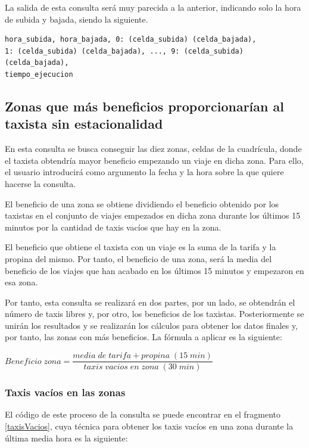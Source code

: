 La salida de esta consulta será muy parecida a la anterior, indicando solo la hora de subida y bajada, siendo la siguiente.

\begin{verbatim}
hora_subida, hora_bajada, 0: (celda_subida) (celda_bajada),
1: (celda_subida) (celda_bajada), ..., 9: (celda_subida) (celda_bajada),
tiempo_ejecucion
\end{verbatim}

\subsection{Zonas que más beneficios proporcionarían al taxista sin estacionalidad \label{profSinExplicacion}}
En esta consulta se busca conseguir las diez zonas, celdas de la cuadrícula, donde el taxista obtendría mayor beneficio empezando un viaje en dicha zona. Para ello, el usuario introducirá como argumento la fecha y la hora sobre la que quiere hacerse la consulta.

El beneficio de una zona se obtiene dividiendo el beneficio obtenido por los taxistas en el conjunto de viajes empezados en dicha zona durante los últimos 15 minutos por la cantidad de taxis vacíos que hay en la zona.

El beneficio que obtiene el taxista con un viaje es la suma de la tarifa y la propina del mismo. Por tanto, el beneficio de una zona, será la media del beneficio de los viajes que han acabado en los últimos 15 minutos y empezaron en esa zona. 

Por tanto, esta consulta se realizará en dos partes, por un lado, se obtendrán el número de taxis libres y, por otro, los beneficios de los taxistas. Posteriormente se unirán los resultados y se realizarán los cálculos para obtener los datos finales y, por tanto, las zonas con más beneficios. La fórmula a aplicar es la siguiente:

\begin{center}
$Beneficio \; zona = \dfrac{media \; de \; tarifa + propina \; (15 \; min)}{taxis \; vacios \; en \; zona \; (30 \; min)}$
\end{center}

\subsubsection{Taxis vacíos en las zonas}
El código de este proceso de la consulta se puede encontrar en el fragmento \ref{taxisVacios}, cuya técnica para obtener los taxis vacíos en una zona durante la última media hora es la siguiente: 


